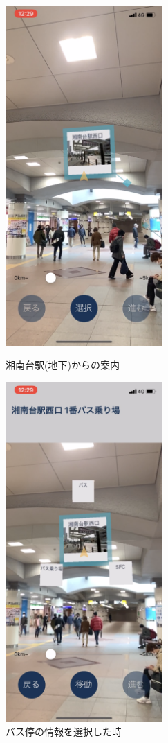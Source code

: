 \begin{figure}[h]
  \begin{minipage}{0.5\hsize}
    \centering
    \includegraphics[width=60mm]{images/shonandai_bus_exit1.png}
    \caption{湘南台駅(地下)からの案内} \label{fig:shonandai_bus_exit1}
  \end{minipage}
  \begin{minipage}{0.5\hsize}
    \centering
    \includegraphics[width=60mm]{images/shonandai_bus_exit_selected.png}
    \caption{バス停の情報を選択した時} \label{fig:shonandai_bus_exit_selected}
  \end{minipage}
\end{figure}

